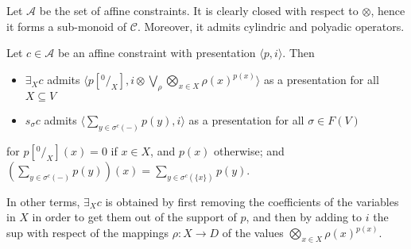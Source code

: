 \documentclass{llncs}
\begin{document}
Let $\mathcal{A}$ be the set of affine constraints.
It is clearly closed with respect to $\otimes$, 
hence it forms a sub-monoid of $\mathcal{C}$.
Moreover, it admits cylindric and polyadic operators.

\begin{proposition}
Let $c \in \mathcal{A}$ be an affine constraint with presentation $\langle p, i \rangle$.
Then 
	\begin{itemize}
		\item  $\exists_X c$ admits $\langle p[^0/_X], i \otimes \bigvee_{\rho} \bigotimes_{x \in X} \rho(x)^{p(x)} \rangle$
		          as a presentation for all $X \subseteq V$
		\item  $s_\sigma c$ admits $\langle \sum_{y \in \sigma^c(-)}p(y), i \rangle$ as a presentation
		          for all $\sigma \in F(V)$
	\end{itemize}
for $p[^0/_X](x) = 0$ if $x \in X$, and $p(x)$ otherwise; and $(\sum_{y \in \sigma^c(-)}p(y))(x) = \sum_{y \in \sigma^c(\{x\})}p(y)$.
\end{proposition}

In other terms, $\exists_X c$ is obtained by first removing the coefficients of the variables in $X$
in order to get them out of the support of $p$, and then by adding to $i$ the sup with respect of the 
mappings $\rho: X \rightarrow D$ of the values $\bigotimes_{x \in X} \rho(x)^{p(x)}$.
\end{document}
